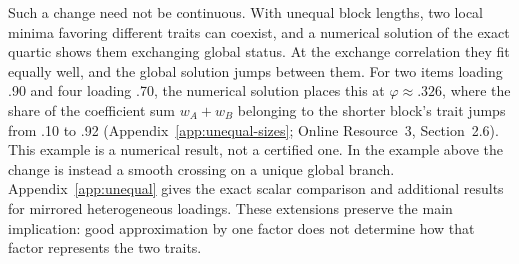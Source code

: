 Such a change need not be continuous. With unequal block lengths, two local minima favoring different traits can coexist, and a numerical solution of the exact quartic shows them exchanging global status. At the exchange correlation they fit equally well, and the global solution jumps between them. For two items loading .90 and four loading .70, the numerical solution places this at $\varphi\approx.326$, where the share of the coefficient sum $w_A+w_B$ belonging to the shorter block's trait jumps from .10 to .92 (Appendix~\ref{app:unequal-sizes}; Online Resource~3, Section~2.6). This example is a numerical result, not a certified one. In the example above the change is instead a smooth crossing on a unique global branch. Appendix~\ref{app:unequal} gives the exact scalar comparison and additional results for mirrored heterogeneous loadings. These extensions preserve the main implication: good approximation by one factor does not determine how that factor represents the two traits.
